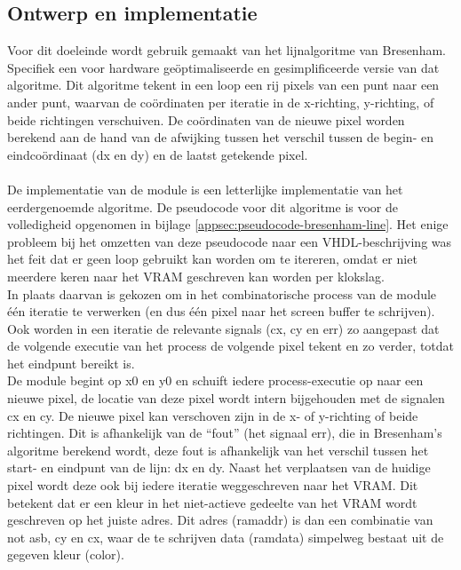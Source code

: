 \documentclass{scrartcl} %
\begin{document}
\subsection{Ontwerp en implementatie}
Voor dit doeleinde wordt gebruik gemaakt van het lijnalgoritme van Bresenham. Specifiek een voor hardware geöptimaliseerde en gesimplificeerde versie van dat algoritme. \cite{line-alg} Dit algoritme tekent in een loop een rij pixels van een punt naar een ander punt, waarvan de coördinaten per iteratie in de x-richting, y-richting, of beide richtingen verschuiven. De coördinaten van de nieuwe pixel worden berekend aan de hand van de afwijking tussen het verschil tussen de begin- en eindcoördinaat (dx en dy) en de laatst getekende pixel.
\\\\
De implementatie van de module is een letterlijke implementatie van het eerdergenoemde algoritme. De pseudocode voor dit algoritme is voor de volledigheid opgenomen in bijlage \ref{appsec:pseudocode-bresenham-line}. Het enige probleem bij het omzetten van deze pseudocode naar een VHDL-beschrijving was het feit dat er geen loop gebruikt kan worden om te itereren, omdat er niet meerdere keren naar het VRAM geschreven kan worden per klokslag.
\\
In plaats daarvan is gekozen om in het combinatorische process van de module één iteratie te verwerken (en dus één pixel naar het screen buffer te schrijven). Ook worden in een iteratie de relevante signals (cx, cy en err) zo aangepast dat de volgende executie van het process de volgende pixel tekent en zo verder, totdat het eindpunt bereikt is.
\\
De module begint op x0 en y0 en schuift iedere process-executie op naar een nieuwe pixel, de locatie van deze pixel wordt intern bijgehouden met de signalen cx en cy. De nieuwe pixel kan verschoven zijn in de x- of y-richting of beide richtingen. Dit is afhankelijk van de ``fout'' (het signaal err), die in Bresenham's algoritme berekend wordt, deze fout is afhankelijk van het verschil tussen het start- en eindpunt van de lijn: dx en dy. Naast het verplaatsen van de huidige pixel wordt deze ook bij iedere iteratie weggeschreven naar het VRAM. Dit betekent dat er een kleur in het niet-actieve gedeelte van het VRAM wordt geschreven op het juiste adres. Dit adres (ramaddr) is dan een combinatie van not asb, cy en cx, waar de te schrijven data (ramdata) simpelweg bestaat uit de gegeven kleur (color).

\end{document}
